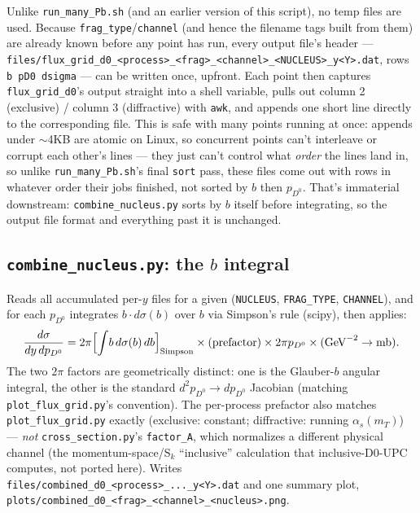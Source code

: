 \documentclass[11pt]{article}
\begin{document}
Unlike \texttt{run\_many\_Pb.sh} (and an earlier version of this script),
no temp files are used. Because \texttt{frag\_type}/\texttt{channel} (and
hence the filename tags built from them) are already known before any
point has run, every output file's header —
\texttt{files/flux\_grid\_d0\_<process>\_<frag>\_<channel>\_<NUCLEUS>\_y<Y>.dat},
rows \texttt{b pD0 dsigma} — can be written once, upfront. Each point then
captures \texttt{flux\_grid\_d0}'s output straight into a shell variable,
pulls out column 2 (exclusive) / column 3 (diffractive) with \texttt{awk},
and appends one short line directly to the corresponding file. This is
safe with many points running at once: appends under $\sim$4KB are atomic
on Linux, so concurrent points can't interleave or corrupt each other's
lines — they just can't control what \emph{order} the lines land in, so
unlike \texttt{run\_many\_Pb.sh}'s final \texttt{sort} pass, these files
come out with rows in whatever order their jobs finished, not sorted by
$b$ then $p_{D^0}$. That's immaterial downstream:
\texttt{combine\_nucleus.py} sorts by $b$ itself before integrating, so
the output file format and everything past it is unchanged.

\subsection{\texttt{combine\_nucleus.py}: the $b$ integral}

Reads all accumulated per-$y$ files for a given
(\texttt{NUCLEUS}, \texttt{FRAG\_TYPE}, \texttt{CHANNEL}), and for each
$p_{D^0}$ integrates $b\cdot d\sigma(b)$ over $b$ via Simpson's rule
(scipy), then applies:
\[
\frac{d\sigma}{dy\,dp_{D^0}} = 2\pi\Big[\!\int\! b\,d\sigma(b)\,db\Big]_{\rm Simpson}
\times \text{(prefactor)} \times 2\pi p_{D^0} \times \text{(GeV}^{-2}\to\text{mb)}.
\]
The two $2\pi$ factors are geometrically distinct: one is the Glauber-$b$
angular integral, the other is the standard $d^2p_{D^0}\to dp_{D^0}$
Jacobian (matching \texttt{plot\_flux\_grid.py}'s convention). The
per-process prefactor also matches \texttt{plot\_flux\_grid.py} exactly
(exclusive: constant; diffractive: running $\alpha_s(m_T)$) —
\emph{not} \texttt{cross\_section.py}'s \texttt{factor\_A}, which
normalizes a different physical channel (the momentum-space/S$_k$
``inclusive'' calculation that inclusive-D0-UPC computes, not ported
here). Writes \texttt{files/combined\_d0\_<process>\_...\_y<Y>.dat} and
one summary plot, \texttt{plots/combined\_d0\_<frag>\_<channel>\_<nucleus>.png}.
\end{document}
